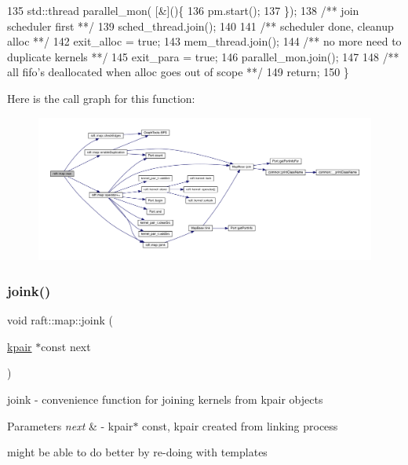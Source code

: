 \begin{DoxyCode}
135       std::thread parallel\_mon( [&]()\{
136          pm.start();
137       \});\textcolor{comment}{}
138 \textcolor{comment}{      /** join scheduler first **/}
139       sched\_thread.join();
140 \textcolor{comment}{}
141 \textcolor{comment}{      /** scheduler done, cleanup alloc **/}
142       exit\_alloc = \textcolor{keyword}{true};
143       mem\_thread.join();\textcolor{comment}{}
144 \textcolor{comment}{      /** no more need to duplicate kernels **/}
145       exit\_para = \textcolor{keyword}{true};
146       parallel\_mon.join();
147 \textcolor{comment}{}
148 \textcolor{comment}{      /** all fifo's deallocated when alloc goes out of scope **/}
149       \textcolor{keywordflow}{return}; 
150    \}
\end{DoxyCode}
Here is the call graph for this function\+:
\nopagebreak
\begin{figure}[H]
\begin{center}
\leavevmode
\includegraphics[width=350pt]{classraft_1_1map_a120b4bf6d1dcb186032e972878dd513d_cgraph}
\end{center}
\end{figure}
\hypertarget{classraft_1_1map_a6d65605c4d3db559332155101ff69e1b}{}\label{classraft_1_1map_a6d65605c4d3db559332155101ff69e1b} 
\subsubsection{\texorpdfstring{joink()}{joink()}}
{\footnotesize\ttfamily void raft\+::map\+::joink (\begin{DoxyParamCaption}\item[{\hyperlink{classkpair}{kpair} $\ast$const}]{next }\end{DoxyParamCaption})\hspace{0.3cm}{\ttfamily [protected]}}

joink -\/ convenience function for joining kernels from kpair objects 
\begin{DoxyParams}{Parameters}
{\em next} & -\/ kpair$\ast$ const, kpair created from linking process \\
\hline
\end{DoxyParams}
might be able to do better by re-\/doing with templates

